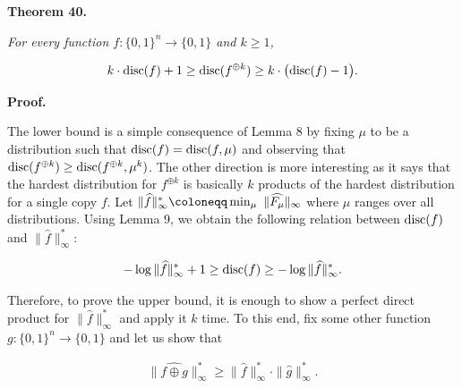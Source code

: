 \documentclass[10pt,a4paper]{article}
\begin{document}


\par\medskip\noindent\textbf{
\textbf{Theorem 40}\textbf{.}
}\par



\emph{For every function $f\colon\{0,1\}^{n}\to\{0,1\}$ and $k\geq 1$,}\par


\[\begin{gathered}
k\cdot{\textup{disc}}(f)+1\geq{\textup{disc}}(f^{\oplus k})\geq k\cdot\big{(}{\textup{disc}}(f)-1\big{)}.
\end{gathered}\]






\par\medskip\noindent\textbf{Proof.}\par




The lower bound is a simple consequence of Lemma 8 by fixing $\mu$ to be a distribution such that ${\textup{disc}}(f)={\textup{disc}}(f,\mu)$ and observing that ${\textup{disc}}(f^{\oplus k})\geq{\textup{disc}}(f^{\oplus k},\mu^{k})$. The other direction is more interesting as it says that the hardest distribution for $f^{\oplus k}$ is basically $k$ products of the hardest distribution for a single copy $f$. Let $\|\widehat{f}\|_{\infty}^{*}\coloneqq\min_{\mu}\nobreak\ \|\widehat{F_{\mu}}\|_{\infty}$ where $\mu$ ranges over all distributions. Using Lemma 9, we obtain the following relation between ${\textup{disc}}(f)$ and $\|\widehat{f}\|_{\infty}^{*}$:\par


\[\begin{gathered}
-\log\|\widehat{f}\|_{\infty}^{*}+1\geq{\textup{disc}}(f)\geq-\log\|\widehat{f}\|_{\infty}^{*}.
\end{gathered}\]


Therefore, to prove the upper bound, it is enough to show a perfect direct product for $\|\widehat{f}\|_{\infty}^{*}$ and apply it $k$ time. To this end, fix some other function $g:\{0,1\}^{n}\to\{0,1\}$ and let us show that\par


\[\begin{gathered}
\|\widehat{f\oplus g}\|_{\infty}^{*}\geq\|\widehat{f}\|_{\infty}^{*}\cdot\|\widehat{g}\|_{\infty}^{*}.
\end{gathered}\]
\end{document}
